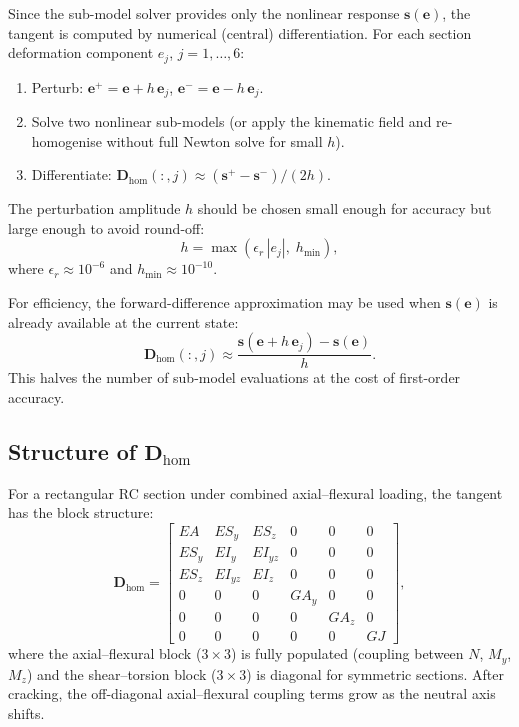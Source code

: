 Since the sub-model solver provides only the nonlinear response
$\mathbf{s}(\mathbf{e})$, the tangent is computed by numerical
(central) differentiation.  For each section deformation component
$e_j$, $j = 1, \ldots, 6$:
\begin{enumerate}
  \item Perturb: $\mathbf{e}^+ = \mathbf{e} + h \, \mathbf{e}_j$,
    $\mathbf{e}^- = \mathbf{e} - h \, \mathbf{e}_j$.
  \item Solve two nonlinear sub-models (or apply the kinematic field
    and re-homogenise without full Newton solve for small $h$).
  \item Differentiate:
    $\mathbf{D}_{\text{hom}}(:, j) \approx
    (\mathbf{s}^+ - \mathbf{s}^-) / (2h)$.
\end{enumerate}

The perturbation amplitude $h$ should be chosen small enough for
accuracy but large enough to avoid round-off:
\begin{equation}
  h = \max(\epsilon_r \, |e_j|, \; h_{\min}),
\end{equation}
where $\epsilon_r \approx 10^{-6}$ and $h_{\min} \approx 10^{-10}$.

For efficiency, the forward-difference approximation may be used when
$\mathbf{s}(\mathbf{e})$ is already available at the current state:
\begin{equation}
  \mathbf{D}_{\text{hom}}(:, j) \approx
  \frac{\mathbf{s}(\mathbf{e} + h\,\mathbf{e}_j) - \mathbf{s}(\mathbf{e})}{h}.
\end{equation}
This halves the number of sub-model evaluations at the cost of
first-order accuracy.

\subsection{Structure of $\mathbf{D}_{\text{hom}}$}

For a rectangular RC section under combined axial--flexural loading, the
tangent has the block structure:
\begin{equation}
  \mathbf{D}_{\text{hom}} =
  \begin{bmatrix}
    EA     & ES_y   & ES_z   & 0      & 0      & 0 \\
    ES_y   & EI_y   & EI_{yz}& 0      & 0      & 0 \\
    ES_z   & EI_{yz}& EI_z   & 0      & 0      & 0 \\
    0      & 0      & 0      & GA_y   & 0      & 0 \\
    0      & 0      & 0      & 0      & GA_z   & 0 \\
    0      & 0      & 0      & 0      & 0      & GJ
  \end{bmatrix},
\end{equation}
where the axial--flexural block ($3 \times 3$) is fully populated
(coupling between $N$, $M_y$, $M_z$) and the shear--torsion block
($3 \times 3$) is diagonal for symmetric sections.  After cracking, the
off-diagonal axial--flexural coupling terms grow as the neutral axis
shifts.


